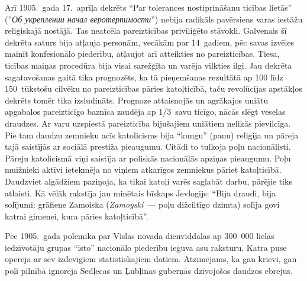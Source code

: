 \documentclass[twoside,a5paper,12pt,fleqn,openany]{extbook}
\newcommand{\pltxti}[1]{\textit{\textpolish{#1}}}
\begin{document}
Arī 1905.~gada 17.~aprīļa dekrēts ``Par tolerances nostiprināšanu ticības lietās'' (''\pltxti{Об укреплении начал веротерпимости}'') nebija radikāls pavērsiens varas iestāžu reliģiskajā nostājā. Tas neatcēla pareizticības priviliģēto stāvokli. Galvenais šī dekrēta saturs bija atļauja personām, vecākām par 14~gadiem, pēc savas izvēles mainīt konfesionālo piederību, atļaujot arī atteikties no pareizticības. Tiesa, ticības maiņas procedūra bija visai sarežģīta un varēja vilkties ilgi. Jau dekrēta sagatavošanas gaitā tika prognozēts, ka tā pieņemšanas rezultātā ap 100 līdz 150~tūkstošu cilvēku no pareizticības pāries katoļticībā, taču revolūcijas apstākļos dekrēts tomēr tika izsludināts. Prognoze attaisnojās un agrākajos uniātu apgabalos pareizticīgo baznīca zaudēja ap 1/3~savu ticīgo, nācās slēgt veselas draudzes. Ar varu uzspiestā pareizticība bijušajiem uniātiem nelikās pievilcīga. Pie tam daudzu zemnieku acīs katolicisms bija ``kungu'' (panu) reliģija un pāreja tajā saistījās ar sociālā prestiža pieaugumu. Citādi to tulkoja poļu nacionālisti. Pāreju katolicismā viņi saistīja ar poliskās nacionālās apziņas pieaugumu. Poļu muižnieki aktīvi ietekmēja no viņiem atkarīgos zemniekus pāriet katoļticībā. Daudzviet algādžiem paziņoja, ka tikai katoļi varēs saglabāt darbu, pārējie tiks atlaisti. Kā vēlāk rakstīja jau minētais bīskaps Jevlogijs: ``Bija draudi, bija solījumi: grāfiene Zamoiska (\pltxti{Zamoyski}~--- poļu dižciltīgo dzimta) solīja govi katrai ģimenei, kura pāries katoļticībā''.

Pēc 1905.~gada polemika par Vislas novada dienviddaļas ap 300~000 lielās iedzīvotāju grupas ``īsto'' nacionālo piederību ieguva asu raksturu. Katra puse operēja ar sev izdevīgiem statistiskajiem datiem. Atzīmējams, ka gan krievi, gan poļi pilnībā ignorēja Sedļecas un Ļubļinas guberņās dzīvojošos daudzos ebrejus.
\end{document}
